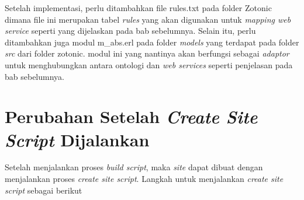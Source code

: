 	Setelah implementasi, perlu ditambahkan file rules.txt pada folder Zotonic dimana file ini merupakan tabel \textit{rules} yang akan digunakan untuk \textit{mapping web service} seperti yang dijelaskan pada bab sebelumnya. Selain itu, perlu ditambahkan juga modul m\_abs.erl pada folder \textit{models} yang terdapat pada folder \textit{src} dari folder zotonic. modul ini yang nantinya akan berfungsi sebagai \textit{adaptor} untuk menghubungkan antara ontologi dan \textit{web services} seperti penjelasan pada bab sebelumnya.
		
\section{Perubahan Setelah \textit{Create Site Script} Dijalankan}

Setelah menjalankan proses \textit{build script}, maka \textit{site} dapat dibuat dengan menjalankan proses \textit{create site script}. Langkah untuk menjalankan \textit{create site script} sebagai berikut

